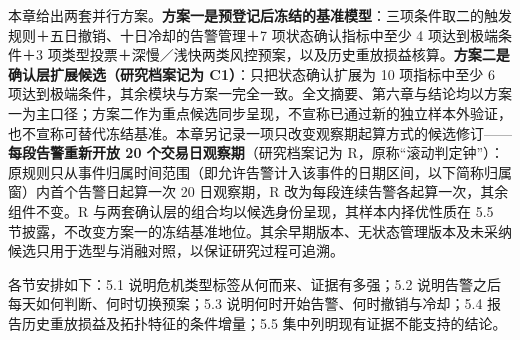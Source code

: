 \documentclass[12pt,a4paper]{ctexart}
\begin{document}
本章给出两套并行方案。\textbf{方案一是预登记后冻结的基准模型}：三项条件取二的触发规则＋五日撤销、十日冷却的告警管理＋7 项状态确认指标中至少 4 项达到极端条件＋3 项类型投票＋深慢／浅快两类风控预案，以及历史重放损益核算。\textbf{方案二是确认层扩展候选（研究档案记为 C1）}：只把状态确认扩展为 10 项指标中至少 6 项达到极端条件，其余模块与方案一完全一致。全文摘要、第六章与结论均以方案一为主口径；方案二作为重点候选同步呈现，不宣称已通过新的独立样本外验证，也不宣称可替代冻结基准。本章另记录一项只改变观察期起算方式的候选修订——\textbf{每段告警重新开放 20 个交易日观察期}（研究档案记为 R，原称“滚动判定钟”）：原规则只从事件归属时间范围（即允许告警计入该事件的日期区间，以下简称归属窗）内首个告警日起算一次 20 日观察期，R 改为每段连续告警各起算一次，其余组件不变。R 与两套确认层的组合均以候选身份呈现，其样本内择优性质在 5.5 节披露，不改变方案一的冻结基准地位。其余早期版本、无状态管理版本及未采纳候选只用于选型与消融对照，以保证研究过程可追溯。\par
各节安排如下：5.1 说明危机类型标签从何而来、证据有多强；5.2 说明告警之后每天如何判断、何时切换预案；5.3 说明何时开始告警、何时撤销与冷却；5.4 报告历史重放损益及拓扑特征的条件增量；5.5 集中列明现有证据不能支持的结论。\par
\end{document}

